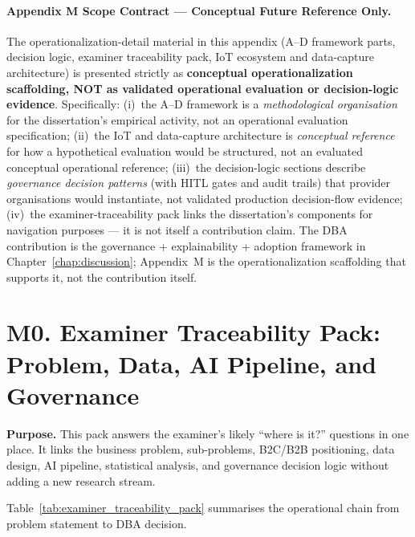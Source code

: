 \paragraph{Appendix M Scope Contract --- Conceptual Future Reference Only.}
\label{para:appendix_m_scope_contract}
The operationalization-detail material in this appendix (A--D framework parts, decision logic, examiner traceability pack, IoT ecosystem and data-capture architecture) is presented strictly as \textbf{conceptual operationalization scaffolding, NOT as validated operational evaluation or decision-logic evidence}. Specifically: (i)~the A--D framework is a \emph{methodological organisation} for the dissertation's empirical activity, not an operational evaluation specification; (ii)~the IoT and data-capture architecture is \emph{conceptual reference} for how a hypothetical evaluation would be structured, not an evaluated conceptual operational reference; (iii)~the decision-logic sections describe \emph{governance decision patterns} (with HITL gates and audit trails) that provider organisations would instantiate, not validated production decision-flow evidence; (iv)~the examiner-traceability pack links the dissertation's components for navigation purposes — it is not itself a contribution claim. The DBA contribution is the governance + explainability + adoption framework in Chapter~\ref{chap:discussion}; Appendix~M is the operationalization scaffolding that supports it, not the contribution itself.

\section*{M0. Examiner Traceability Pack: Problem, Data, AI Pipeline, and Governance}
\label{sec:appm_examiner_traceability_pack}

\noindent\textbf{Purpose.} This pack answers the examiner's likely ``where is it?'' questions in one place. It links the business problem, sub-problems, B2C/B2B positioning, data design, AI pipeline, statistical analysis, and governance decision logic without adding a new research stream.

\noindent Table~\ref{tab:examiner_traceability_pack} summarises the operational chain from problem statement to DBA decision.

